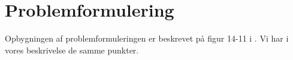 \documentclass[12pt]{article}
\begin{document}

\clearpage\maketitle
\thispagestyle{empty}

\newpage

\tableofcontents %

\thispagestyle{empty}

\newpage
\pagestyle{plain}
\setcounter{page}{1}

\section{Problemformulering}
Opbygningen af problemformuleringen er beskrevet på figur 14-11 i \cite{OOSE}. Vi har i vores beskrivelse de samme punkter.
\end{document}
